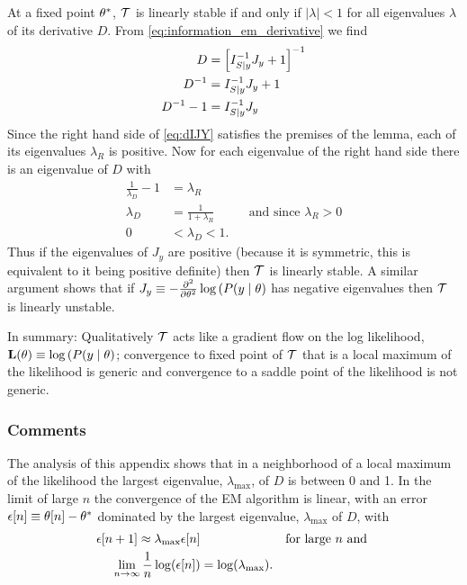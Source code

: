 At a fixed point ${\theta^*}$, $\EMmap$ is linearly stable if and
only if $\left| \lambda \right| < 1$ for all eigenvalues $\lambda$ of
its derivative $D$.  From \eqref{eq:information_em_derivative} we find
\begin{align}
  \nonumber
  D &= \left[I_{S \mid y}^{-1} J_y + 1 \right]^{-1} \\
  \nonumber
  D^{-1} &= I_{S \mid y}^{-1} J_y + 1 \\
  \label{eq:dIJY}
  D^{-1} -1  &= I_{S \mid y}^{-1} J_y
\end{align}
Since the right hand side of \eqref{eq:dIJY} satisfies the premises of
the lemma, each of its eigenvalues $\lambda_R$ is positive.  Now for
each eigenvalue of the right hand side there is an eigenvalue of $D$
with
\begin{align}
  \nonumber
  \frac{1}{\lambda_D} - 1 &= \lambda_R  \\
  \nonumber
  \lambda_D &= \frac{1}{1+\lambda_R} &&\text{and since } \lambda_R >0 \\
  \label{eq:D_is_stable}
  0 &< \lambda_D < 1.
\end{align}
Thus if the eigenvalues of $J_y$ are positive (because it is
symmetric, this is equivalent to it being positive definite) then
$\EMmap$ is linearly stable.  A similar argument shows that if
$J_y\equiv-\frac{\partial^2}{\partial \theta^2} \log \left( P(y \mid
  \theta \right)$ has negative eigenvalues then $\EMmap$ is linearly
unstable.

In summary: Qualitatively $\EMmap$ acts like a gradient flow on the
log likelihood,
${\bf L}(\theta) \equiv\log \left( P(y \mid \theta
\right)$; convergence to fixed point of $\EMmap$ that is a local
maximum of the likelihood is generic and convergence to a saddle point
of the likelihood is not generic.

\subsubsection{Comments}
\label{sec:ConvergenceRate}

The analysis of this appendix shows that in a neighborhood of a local
maximum of the likelihood the largest eigenvalue,
$\lambda_{\text{max}}$, of $D$ is between 0 and 1.  In the limit of
large $n$ the convergence of the EM algorithm is linear, with an error
${\epsilon}{[n]} \equiv {\theta}{[n]} - {\theta^*}$
dominated by the largest eigenvalue, $\lambda_{\text{max}}$ of $D$,
with
\begin{align*}
  {\epsilon}{[n+1]} \approx \lambda_{\text{max}} {\epsilon}{[n]}
  &&\text{for large } n \text{ and }\\
  \lim_{n \rightarrow \infty} \frac{1}{n}\log({\epsilon}{[n]}) &= \log(\lambda_{\text{max}}).
\end{align*}


